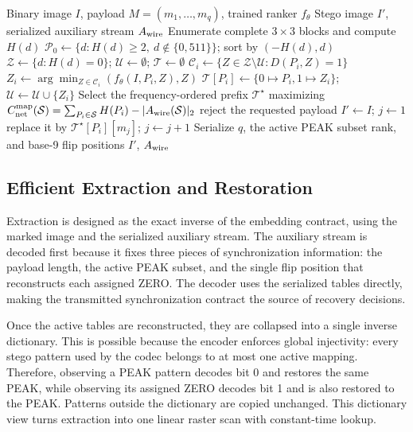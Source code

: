 \documentclass[a4paper,fleqn]{cas-dc}
\begin{document}
\begin{algorithm*}[t]
\caption{Net-Aware CNN-Ranked Distance-One Embedding}
\label{alg:embedding}
\begin{algorithmic}[1]
\Require Binary image $I$, payload $M=(m_1,\ldots,m_q)$, trained ranker $f_\theta$
\Ensure Stego image $I'$, serialized auxiliary stream $A_{\rm wire}$
\State Enumerate complete $3\times3$ blocks and compute $H(d)$
\State $\mathcal P_0\gets\{d:H(d)\ge2,\ d\notin\{0,511\}\}$; sort by $(-H(d),d)$
\State $\mathcal Z\gets\{d:H(d)=0\}$; $\mathcal U\gets\emptyset$; $\mathcal T\gets\emptyset$
    \State $\mathcal C_i\gets\{Z\in\mathcal Z\setminus\mathcal U:D(P_i,Z)=1\}$
        \State $Z_i\gets\arg\min_{Z\in\mathcal C_i}(f_\theta(I,P_i,Z),Z)$
        \State $\mathcal T[P_i]\gets\{0\mapsto P_i,1\mapsto Z_i\}$;
        $\mathcal U\gets\mathcal U\cup\{Z_i\}$
    \EndIf
\EndFor
\State Select the frequency-ordered prefix $\mathcal T^\star$ maximizing
$C_{\rm net}^{\rm map}(\mathcal S)=
\sum_{P_i\in\mathcal S}H(P_i)-|A_{\rm wire}(\mathcal S)|_2$
    \State reject the requested payload
\EndIf
\State $I'\gets I$; $j\gets1$
        \State replace it by $\mathcal T^\star[P_i][m_j]$; $j\gets j+1$
    \EndIf
\EndFor
\State Serialize $q$, the active PEAK subset rank, and base-9 flip positions
\State \Return $I'$, $A_{\rm wire}$
\end{algorithmic}
\end{algorithm*}

\subsection{Efficient Extraction and Restoration}
Extraction is designed as the exact inverse of the embedding contract, using
the marked image and the serialized auxiliary stream. The auxiliary stream
is decoded first because it fixes three pieces of synchronization information:
the payload length, the active PEAK subset, and the single flip position that
reconstructs each assigned ZERO. The decoder uses the serialized tables
directly, making the transmitted synchronization contract the source of
recovery decisions.

Once the active tables are reconstructed, they are collapsed into a single
inverse dictionary. This is possible because the encoder enforces global
injectivity: every stego pattern used by the codec belongs to at most one active
mapping. Therefore, observing a PEAK pattern decodes bit 0 and restores the same
PEAK, while observing its assigned ZERO decodes bit 1 and is also restored to
the PEAK. Patterns outside the dictionary are copied unchanged. This dictionary
view turns extraction into one linear raster scan with constant-time lookup.
\end{document}
